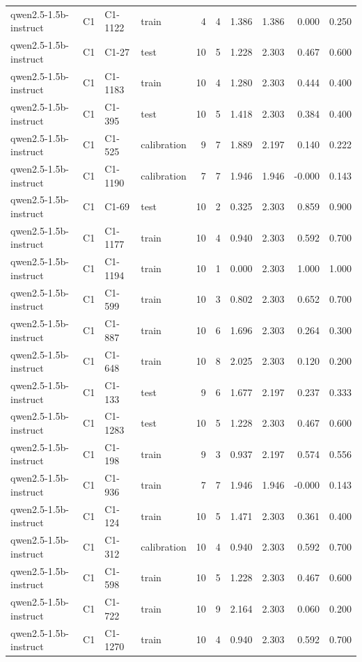 \begin{table}
\begin{tabular}{llllrrrrrr}
qwen2.5-1.5b-instruct & C1 & C1-1122 & train & 4 & 4 & 1.386 & 1.386 & 0.000 & 0.250 \\
qwen2.5-1.5b-instruct & C1 & C1-27 & test & 10 & 5 & 1.228 & 2.303 & 0.467 & 0.600 \\
qwen2.5-1.5b-instruct & C1 & C1-1183 & train & 10 & 4 & 1.280 & 2.303 & 0.444 & 0.400 \\
qwen2.5-1.5b-instruct & C1 & C1-395 & test & 10 & 5 & 1.418 & 2.303 & 0.384 & 0.400 \\
qwen2.5-1.5b-instruct & C1 & C1-525 & calibration & 9 & 7 & 1.889 & 2.197 & 0.140 & 0.222 \\
qwen2.5-1.5b-instruct & C1 & C1-1190 & calibration & 7 & 7 & 1.946 & 1.946 & -0.000 & 0.143 \\
qwen2.5-1.5b-instruct & C1 & C1-69 & test & 10 & 2 & 0.325 & 2.303 & 0.859 & 0.900 \\
qwen2.5-1.5b-instruct & C1 & C1-1177 & train & 10 & 4 & 0.940 & 2.303 & 0.592 & 0.700 \\
qwen2.5-1.5b-instruct & C1 & C1-1194 & train & 10 & 1 & 0.000 & 2.303 & 1.000 & 1.000 \\
qwen2.5-1.5b-instruct & C1 & C1-599 & train & 10 & 3 & 0.802 & 2.303 & 0.652 & 0.700 \\
qwen2.5-1.5b-instruct & C1 & C1-887 & train & 10 & 6 & 1.696 & 2.303 & 0.264 & 0.300 \\
qwen2.5-1.5b-instruct & C1 & C1-648 & train & 10 & 8 & 2.025 & 2.303 & 0.120 & 0.200 \\
qwen2.5-1.5b-instruct & C1 & C1-133 & test & 9 & 6 & 1.677 & 2.197 & 0.237 & 0.333 \\
qwen2.5-1.5b-instruct & C1 & C1-1283 & test & 10 & 5 & 1.228 & 2.303 & 0.467 & 0.600 \\
qwen2.5-1.5b-instruct & C1 & C1-198 & train & 9 & 3 & 0.937 & 2.197 & 0.574 & 0.556 \\
qwen2.5-1.5b-instruct & C1 & C1-936 & train & 7 & 7 & 1.946 & 1.946 & -0.000 & 0.143 \\
qwen2.5-1.5b-instruct & C1 & C1-124 & train & 10 & 5 & 1.471 & 2.303 & 0.361 & 0.400 \\
qwen2.5-1.5b-instruct & C1 & C1-312 & calibration & 10 & 4 & 0.940 & 2.303 & 0.592 & 0.700 \\
qwen2.5-1.5b-instruct & C1 & C1-598 & train & 10 & 5 & 1.228 & 2.303 & 0.467 & 0.600 \\
qwen2.5-1.5b-instruct & C1 & C1-722 & train & 10 & 9 & 2.164 & 2.303 & 0.060 & 0.200 \\
qwen2.5-1.5b-instruct & C1 & C1-1270 & train & 10 & 4 & 0.940 & 2.303 & 0.592 & 0.700 \\

\end{tabular}
\end{table}
